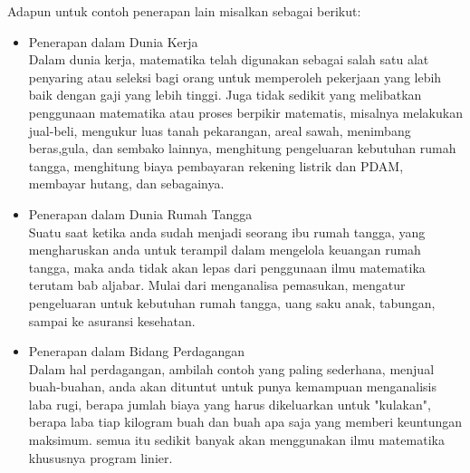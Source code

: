 \documentclass[11pt,fleqn]{book} %
\begin{document}
Adapun untuk contoh penerapan lain misalkan sebagai berikut:
\begin{itemize}
\item Penerapan dalam Dunia Kerja\\
Dalam dunia kerja, matematika telah digunakan sebagai salah satu alat penyaring atau seleksi bagi orang untuk memperoleh pekerjaan yang lebih baik dengan gaji yang lebih tinggi. Juga tidak sedikit yang melibatkan penggunaan matematika atau proses berpikir matematis, misalnya melakukan jual-beli, mengukur luas tanah pekarangan, areal sawah, menimbang beras,gula, dan sembako lainnya, menghitung pengeluaran kebutuhan rumah tangga, menghitung biaya pembayaran rekening listrik dan PDAM, membayar hutang, dan sebagainya.

\item Penerapan dalam Dunia Rumah Tangga\\
Suatu saat ketika anda sudah menjadi seorang ibu rumah tangga, yang mengharuskan anda untuk terampil dalam mengelola keuangan rumah tangga, maka anda tidak akan lepas dari penggunaan ilmu matematika terutam bab aljabar. Mulai dari menganalisa pemasukan, mengatur pengeluaran untuk kebutuhan rumah tangga, uang saku anak, tabungan, sampai ke asuransi kesehatan.

\item Penerapan dalam Bidang Perdagangan\\
Dalam hal perdagangan, ambilah contoh yang paling sederhana, menjual buah-buahan, anda akan dituntut untuk punya kemampuan menganalisis laba rugi, berapa jumlah biaya yang harus dikeluarkan untuk "kulakan", berapa laba tiap kilogram buah dan buah apa saja yang memberi keuntungan maksimum. semua itu sedikit banyak akan menggunakan ilmu matematika khususnya program linier.
\end{itemize}
 
\end{document}
